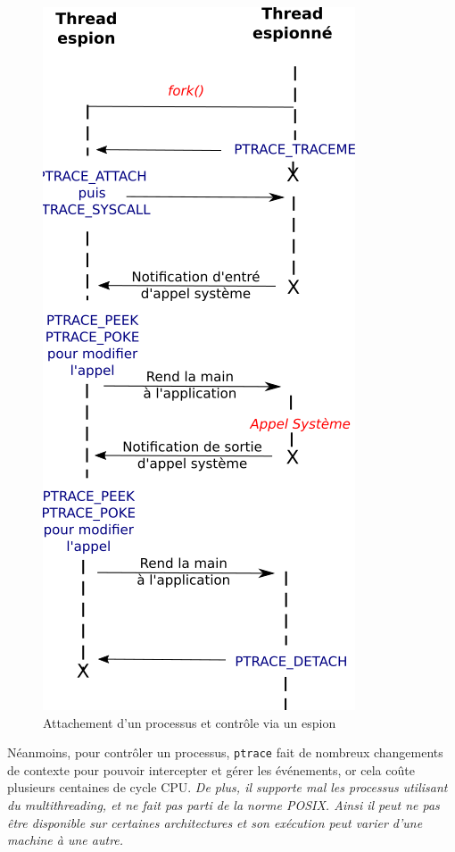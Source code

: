 \begin{figure}
   \centering
   \includegraphics[scale=0.5]{Pictures/png/ptrace_fonctionnement}
   \caption{Attachement d'un processus et contrôle via un espion}
   \label{PTRACE_FONCTIONNEMENT}
 \end{figure}

Néanmoins, pour contrôler un processus, \texttt{ptrace} fait de nombreux
changements de contexte pour pouvoir intercepter et gérer les événements, or
cela coûte plusieurs centaines de cycle CPU. \textit{De plus, il supporte mal
  les processus utilisant du multithreading, et ne fait pas parti de la norme
  POSIX. Ainsi il peut ne pas être disponible sur certaines architectures et son
  exécution peut varier d'une machine à une autre.}

